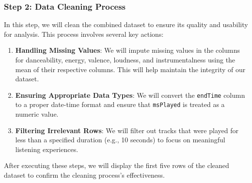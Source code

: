 \documentclass[
]{article}
\begin{document}
\subsubsection{Step 2: Data Cleaning
Process}\label{step-2-data-cleaning-process}

In this step, we will clean the combined dataset to ensure its quality
and usability for analysis. This process involves several key actions:

\begin{enumerate}
\def\labelenumi{\arabic{enumi}.}
\item
  \textbf{Handling Missing Values}: We will impute missing values in the
  columns for danceability, energy, valence, loudness, and
  instrumentalness using the mean of their respective columns. This will
  help maintain the integrity of our dataset.
\item
  \textbf{Ensuring Appropriate Data Types}: We will convert the
  \texttt{endTime} column to a proper date-time format and ensure that
  \texttt{msPlayed} is treated as a numeric value.
\item
  \textbf{Filtering Irrelevant Rows}: We will filter out tracks that
  were played for less than a specified duration (e.g., 10 seconds) to
  focus on meaningful listening experiences.
\end{enumerate}

After executing these steps, we will display the first five rows of the
cleaned dataset to confirm the cleaning process's effectiveness.
\end{document}
